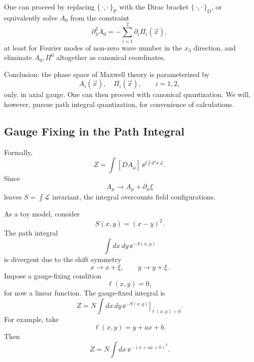 One can proceed by replacing \(\{\,\cdot,\cdot\,\}_{\mathrm P}\) with the
Dirac bracket \(\{\,\cdot,\cdot\,\}_{\mathrm D}\), or equivalently solve
\(A_0\) from the constraint
\[
  \partial_3^2A_0
  =
  -\sum_{i=1}^2\partial_i\Pi_i(\vec x),
\]
at least for Fourier modes of non-zero wave number in the \(x_3\)
direction, and eliminate \(A_0,\Pi^0\) altogether as canonical coordinates.

Conclusion: the phase space of Maxwell theory is parameterized by
\[
  A_i(\vec x),\quad \Pi_i(\vec x),
  \qquad i=1,2,
\]
only, in axial gauge.  One can then proceed with canonical quantization.
We will, however, pursue path integral quantization, for convenience of
calculations.

\subsection{Gauge Fixing in the Path Integral}

Formally,
\[
  Z=\int [DA_\mu]\,\ee^{\ii\int d^4x\,\mathcal L}.
\]
Since
\[
  A_\mu\to A_\mu+\partial_\mu\xi
\]
leaves \(S=\int\mathcal L\) invariant, the integral overcounts field
configurations.

\begin{center}
\end{center}

As a toy model, consider
\[
  S(x,y)=(x-y)^2.
\]
The path integral
\[
  \int dx\,dy\,\ee^{-S(x,y)}
\]
is divergent due to the shift symmetry
\[
  x\to x+\xi,\qquad y\to y+\xi.
\]
Impose a gauge-fixing condition
\[
  \ell(x,y)=0,
\]
for now a linear function.  The gauge-fixed integral is
\[
  Z=N\int dx\,dy\,\left.\ee^{-S(x,y)}\right|_{\ell(x,y)=0}.
\]
For example, take
\[
  \ell(x,y)=y+ax+b.
\]
Then
\[
  Z=N\int dx\,\ee^{-(x+ax+b)^2}.
\]

